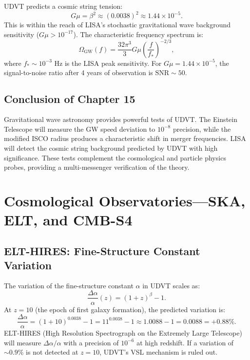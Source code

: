 \documentclass[12pt,a4paper]{book}
\theoremstyle{definition}
\theoremstyle{remark}
\begin{document}
UDVT predicts a cosmic string tension:
\begin{equation}
    G\mu = \beta^2 \approx (0.0038)^2 \approx 1.44 \times 10^{-5}.
\end{equation}
This is within the reach of LISA's stochastic gravitational wave background sensitivity ($G\mu > 10^{-17}$). The characteristic frequency spectrum is:
\begin{equation}
    \Omega_{\mathrm{GW}}(f) = \frac{32\pi^3}{3} G\mu \left(\frac{f}{f_*}\right)^{-2/3},
\end{equation}
where $f_* \sim 10^{-3}$ Hz is the LISA peak sensitivity. For $G\mu = 1.44 \times 10^{-5}$, the signal-to-noise ratio after 4 years of observation is $\mathrm{SNR} \sim 50$.

\section{Conclusion of Chapter 15}

Gravitational wave astronomy provides powerful tests of UDVT. The Einstein Telescope will measure the GW speed deviation to $10^{-8}$ precision, while the modified ISCO radius produces a characteristic shift in merger frequencies. LISA will detect the cosmic string background predicted by UDVT with high significance. These tests complement the cosmological and particle physics probes, providing a multi-messenger verification of the theory.


\chapter{Cosmological Observatories---SKA, ELT, and CMB-S4}
\label{ch:cosmo_obs}

\section{ELT-HIRES: Fine-Structure Constant Variation}

The variation of the fine-structure constant $\alpha$ in UDVT scales as:
\begin{equation}
    \frac{\Delta\alpha}{\alpha}(z) = (1+z)^{\beta} - 1.
\end{equation}
At $z = 10$ (the epoch of first galaxy formation), the predicted variation is:
\begin{equation}
    \frac{\Delta\alpha}{\alpha} = (1+10)^{0.0038} - 1 = 11^{0.0038} - 1 \approx 1.0088 - 1 = 0.0088 = +0.88\%.
\end{equation}
ELT-HIRES (High Resolution Spectrograph on the Extremely Large Telescope) will measure $\Delta\alpha/\alpha$ with a precision of $10^{-6}$ at high redshift. If a variation of $\sim 0.9\%$ is not detected at $z = 10$, UDVT's VSL mechanism is ruled out.
\end{document}

